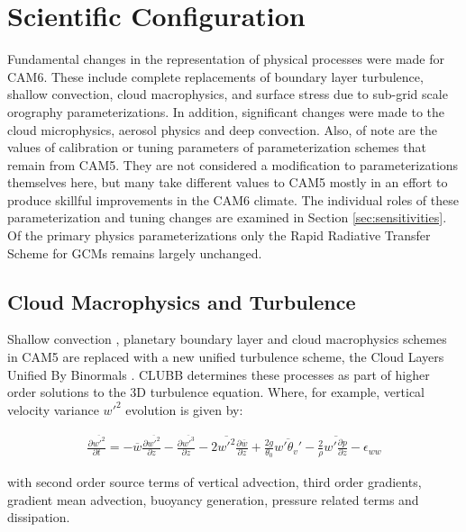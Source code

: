 \section{Scientific Configuration}
\label{sec:description}
Fundamental changes in the representation of physical processes were made for CAM6. These include complete replacements of boundary layer turbulence, shallow convection, cloud macrophysics, and surface stress due to sub-grid scale orography parameterizations. In addition, significant changes were made to the cloud microphysics, aerosol physics and deep convection. Also, of note are the values of calibration or tuning parameters of parameterization schemes that remain from CAM5. They are not considered a modification to parameterizations themselves here, but many take different values to CAM5 mostly in an effort to produce skillful improvements in the CAM6 climate. The individual roles of these parameterization and tuning changes are examined in Section \ref{sec:sensitivities}. Of the primary physics parameterizations only the Rapid Radiative Transfer Scheme for GCMs \citep[RRTMG,][]{Iacono2008,Mlawer1997} remains largely unchanged. 

\subsection{Cloud Macrophysics and Turbulence}

Shallow convection \citep{Bretherton2004}, planetary boundary layer \citep{Bretherton2009} and cloud macrophysics \citep{Park2014} schemes in CAM5 are replaced with a new unified turbulence scheme, the Cloud Layers Unified By Binormals \citep[CLUBB,][]{Golaz2002a,Golaz2002}. CLUBB determines these processes as part of higher order solutions to the 3D turbulence equation. Where, for example, vertical velocity variance $w'^{2}$ evolution is given by:

%
\begin{eqnarray}
  \frac{\partial\overline{w'^2}}{\partial 
t}=-\overline{w}\frac{\partial\overline{w'^2}}{\partial z}-\frac{\partial\overline{w'^3}}{\partial z}-2\overline{w'^2} \frac{\partial\overline{w}}{\partial z}+\frac{2g}{\theta_0}\overline{w'\theta_v'}-\frac{2}{\rho}\overline{w'\frac{\partial p}{\partial z}}-\epsilon_{ww}
\end{eqnarray}

with second order source terms of vertical advection, third order gradients, gradient mean advection, buoyancy generation, pressure related terms and dissipation.

